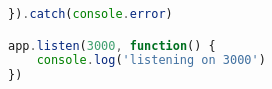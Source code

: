\begin{lstlisting}[language=JavaScript, caption=Server code, label=lst:impl:server]
    }).catch(console.error)

app.listen(3000, function() {
    console.log('listening on 3000')
})

    \end{lstlisting}